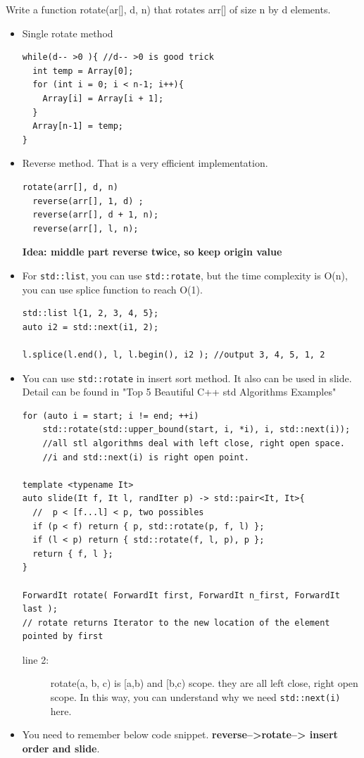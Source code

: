 \documentclass[a4paper,11pt,twoside]{book}
\begin{document}
	\par  Write a function rotate(ar[], d, n) that rotates arr[] of size n by d elements.
\begin{itemize}
	
	\item Single rotate method
\begin{lstlisting}[breaklines]
while(d-- >0 ){ //d-- >0 is good trick
  int temp = Array[0];
  for (int i = 0; i < n-1; i++){
    Array[i] = Array[i + 1];
  }
  Array[n-1] = temp;
}
\end{lstlisting}

	\item Reverse method. That is a very efficient implementation.
\begin{lstlisting}[breaklines]
rotate(arr[], d, n)
  reverse(arr[], 1, d) ;
  reverse(arr[], d + 1, n);
  reverse(arr[], l, n);
\end{lstlisting}
\textbf{Idea: middle part reverse twice, so keep origin value}

	\item For \texttt{std::list}, you can use \texttt{std::rotate}, but the time complexity is O(n), you can use splice function to reach O(1).  
\begin{lstlisting}
std::list l{1, 2, 3, 4, 5};
auto i2 = std::next(i1, 2);

l.splice(l.end(), l, l.begin(), i2 ); //output 3, 4, 5, 1, 2
\end{lstlisting}


	\item You can use \texttt{std::rotate} in insert sort method. It also can be used in slide. Detail can be found in "Top 5 Beautiful C++ std Algorithms Examples"
\begin{lstlisting}[breaklines, basicstyle=\scriptsize]
for (auto i = start; i != end; ++i)
	std::rotate(std::upper_bound(start, i, *i), i, std::next(i));  
	//all stl algorithms deal with left close, right open space. 
	//i and std::next(i) is right open point.

template <typename It> 
auto slide(It f, It l, randIter p) -> std::pair<It, It>{
  //  p < [f...l] < p, two possibles 
  if (p < f) return { p, std::rotate(p, f, l) };
  if (l < p) return { std::rotate(f, l, p), p };
  return { f, l };
}

ForwardIt rotate( ForwardIt first, ForwardIt n_first, ForwardIt last );
// rotate returns Iterator to the new location of the element pointed by first
\end{lstlisting}
\begin{description}
	\item[line 2:] rotate(a, b, c) is [a,b) and [b,c) scope. they are all left close, right open scope. In this way, you can understand why we need \texttt{std::next(i)} here.
\end{description}

	\item You need to remember below code snippet. \textbf{reverse-->rotate--> insert order and slide}. 

\end{itemize}
\end{document}
